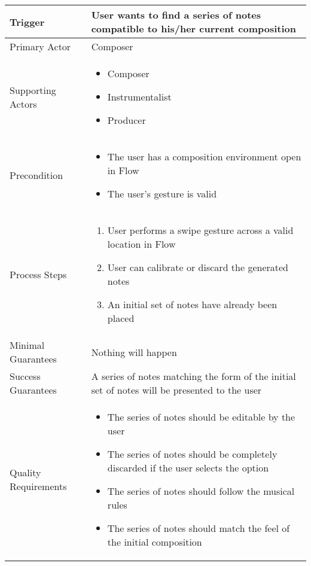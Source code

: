 \begin{longtable}{|X|X|}
\hline
Trigger & User wants to find a series of notes compatible to his/her current composition \\
\hline
Primary Actor & Composer\\
\hline
Supporting Actors & 
\begin{itemize}
\item Composer
\item Instrumentalist
\item Producer
\end{itemize}\\
\hline
Precondition & 
\begin{itemize}
\item The user has a composition environment open in Flow
\item The user's gesture is valid
\end{itemize}\\
\hline
Process Steps & 
\begin{enumerate}
\item User performs a swipe gesture across a valid location in Flow
\item User can calibrate or discard the generated notes
\item An initial set of notes have already been placed
\end{enumerate}\\
\hline
Minimal Guarantees & Nothing will happen \\
\hline
Success Guarantees & A series of notes matching the form of the initial set of notes will be presented to the user \\
\hline
Quality Requirements & 
\begin{itemize}
\item The series of notes should be editable by the user
\item The series of notes should be completely discarded if the user selects the option
\item The series of notes should follow the musical rules
\item The series of notes should match the feel of the initial composition
\end{itemize} \\ 
\hline
\end{longtable}